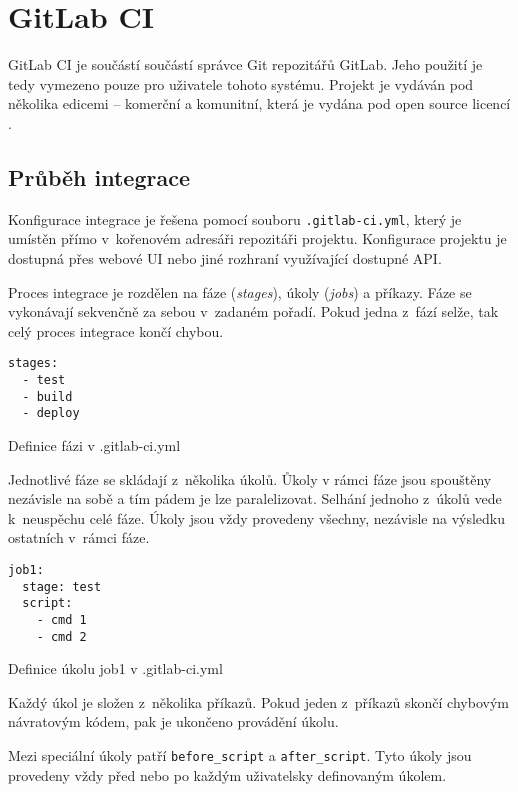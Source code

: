 \chapter{GitLab CI}

GitLab CI je součástí součástí správce Git repozitářů GitLab.
Jeho použití je tedy vymezeno pouze pro uživatele tohoto systému.
Projekt je vydáván pod několika edicemi -- komerční a komunitní, která je vydána pod open source licencí \cite{gitlab_ce}.

\section{Průběh integrace}

Konfigurace integrace je řešena pomocí souboru \verb|.gitlab-ci.yml|, který je umístěn přímo v~kořenovém adresáři repozitáři projektu.
Konfigurace projektu je dostupná přes webové UI nebo jiné rozhraní využívající dostupné API.

Proces integrace je rozdělen na fáze (\textit{stages}), úkoly (\textit{jobs}) a příkazy.
Fáze se vykonávají sekvenčně za sebou v~zadaném pořadí.
Pokud jedna z~fází selže, tak celý proces integrace končí chybou.

\begin{listing}[ht]
\begin{verbatim}
stages:
  - test
  - build
  - deploy
\end{verbatim}
\caption{Definice fázi v .gitlab-ci.yml}
\end{listing}

Jednotlivé fáze se skládají z~několika úkolů.
Ůkoly v rámci fáze jsou spouštěny nezávisle na sobě a tím pádem je lze paralelizovat.
Selhání jednoho z~úkolů vede k~neuspěchu celé fáze.
Úkoly jsou vždy provedeny všechny, nezávisle na výsledku ostatních v~rámci fáze.

\begin{listing}[ht]
\begin{verbatim}
job1:
  stage: test
  script:
    - cmd 1
    - cmd 2
\end{verbatim}
\caption{Definice úkolu job1 v .gitlab-ci.yml}
\end{listing}

Každý úkol je složen z~několika příkazů.
Pokud jeden z~příkazů skončí chybovým návratovým kódem, pak je ukončeno provádění úkolu.

Mezi speciální úkoly patří \verb|before_script| a \verb|after_script|.
Tyto úkoly jsou provedeny vždy před nebo po každým uživatelsky definovaným úkolem.

